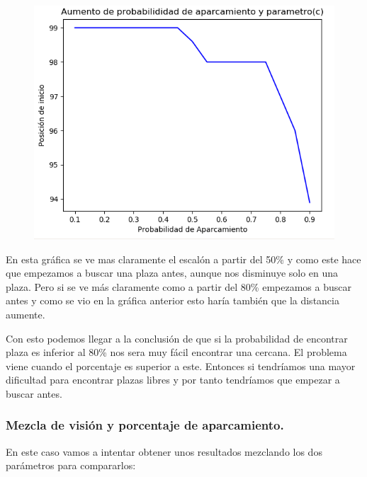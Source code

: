 \documentclass[]{article}
\begin{document}
\begin{figure}[H]
	\centering
	\includegraphics[width=1\linewidth]{img/screenshot013}
	\label{fig:screenshot013}
\end{figure}

En esta gráfica se ve mas claramente el escalón a partir del 50\% y como este hace que empezamos a buscar una plaza antes, aunque nos disminuye solo en una plaza. Pero si se ve más claramente como a partir del 80\% empezamos a buscar antes y como se vio en la gráfica anterior esto haría también que la distancia aumente.

Con esto podemos llegar a la conclusión de que si la probabilidad de encontrar plaza es inferior al 80\% nos sera muy fácil encontrar una cercana. El problema viene cuando el porcentaje es superior a este. Entonces si tendríamos una mayor dificultad para encontrar plazas libres y por tanto tendríamos que empezar a buscar antes.

\newpage
\subsubsection{Mezcla de visión y porcentaje de aparcamiento.}

En este caso vamos a intentar obtener unos resultados mezclando los dos parámetros para compararlos:
\end{document}
